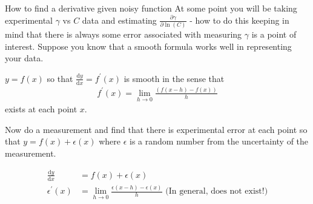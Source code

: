 \documentclass{article}
\renewcommand{\d}{\mathrm{d}}
\newcommand{\dOne}[2]{\frac{\d#1}{\d#2}}
\newcommand{\pOne}[2]{\frac{\partial#1}{\partial#2}}
\begin{document}
\begin{section}{How to find a derivative given noisy function}
At some point you will be taking experimental $\gamma$ vs $C$ data and estimating $\pOne{\gamma}{\ln{(C)}}$ - how to do this keeping in mind that there is always some error associated with measuring $\gamma$ is a point of interest.
  Suppose you know that a smooth formula works well in representing your data.
	
	$y = f(x)$ so that $ \dOne{y}{x} = f^\prime (x)$ is smooth in the sense that
	\begin{align*}
		f^\prime(x) = \lim_{h\rightarrow 0}{\frac{(f(x-h) - f(x))}{h}}
	\end{align*} exists at each point $x$.

	Now do a measurement and find that there is experimental error at each point so that 
$y = f(x) + \epsilon(x)$ where $\epsilon$ is a random number from the uncertainty of the measurement.

\begin{align*}
\dOne{y}{x} &= f(x) + \epsilon(x)\\
\epsilon^\prime(x) &= \lim_{h\rightarrow 0} \frac{\epsilon(x-h)-\epsilon(x)}{h} \text{ (In general, does not exist!)}
\end{align*}
\end{section}
\end{document}
